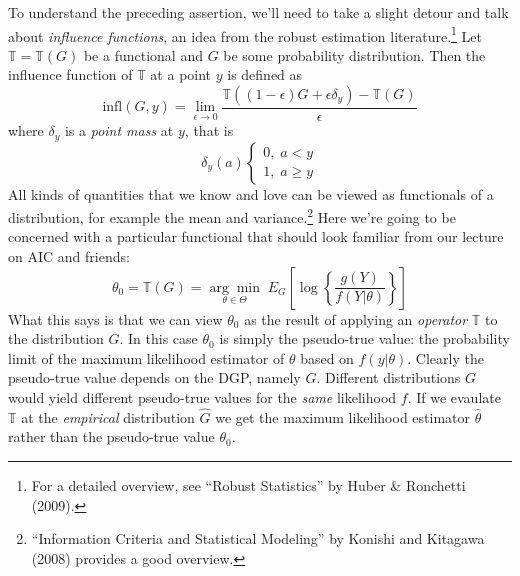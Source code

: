 To understand the preceding assertion, we'll need to take a slight detour and talk about \emph{influence functions}, an idea from the robust estimation literature.\footnote{For a detailed overview, see ``Robust Statistics'' by Huber \& Ronchetti (2009).} 
Let $\mathbb{T}=\mathbb{T}(G)$ be a functional and $G$ be some probability distribution. 
Then the influence function of $\mathbb{T}$ at a point $y$ is defined as 
	$$\mbox{infl}(G,y) = \lim_{\epsilon \rightarrow 0} \frac{\mathbb{T}\left(\left(1-\epsilon\right)G + \epsilon \delta_y\right) - \mathbb{T}(G)}{\epsilon}$$
where $\delta_y$ is a \emph{point mass} at $y$, that is
		$$\delta_y(a)\left\{\begin{array}{c} 0, \; a<y \\ 1, \; a\geq y\end{array} \right.$$
All kinds of quantities that we know and love can be viewed as functionals of a distribution, for example the mean and variance.\footnote{``Information Criteria and Statistical Modeling'' by Konishi and Kitagawa (2008) provides a good overview.} 
Here we're going to be concerned with a particular functional that should look familiar from our lecture on AIC and friends:
	$$\theta_0 = \mathbb{T}(G) = \underset{\theta \in \Theta}{\arg \min} \;E_G\left[\log\left\{\frac{g(Y)}{f(Y|\theta)} \right\} \right]$$
What this says is that we can view $\theta_0$ as the result of applying an \emph{operator} $\mathbb{T}$ to the distribution $G$. 
In this case $\theta_0$ is simply the pseudo-true value: the probability limit of the maximum likelihood estimator of $\theta$ based on $f(y|\theta)$. 
Clearly the pseudo-true value depends on the DGP, namely $G$. 
Different distributions $G$ would yield different pseudo-true values for the \emph{same} likelihood $f$. 
If we evaulate $\mathbb{T}$ at the \emph{empirical} distribution $\widehat{G}$ we get the maximum likelihood estimator $\widehat{\theta}$ rather than the pseudo-true value $\theta_0$.



